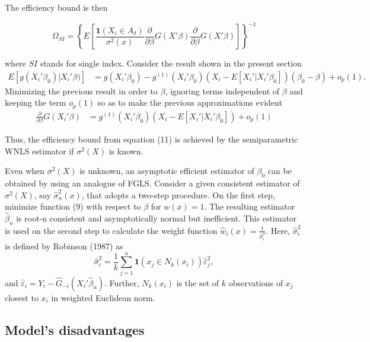\documentclass[a4paper]{article}
\begin{document}
The efficiency bound is then

\begin{equation}
\Omega_{SI} = \left\{ E\left[\frac{\mathbf{1}{(X_i \in A_\delta)}}{\sigma^2(x)}\frac{\partial}{\partial \beta}
 G(X'\beta)\frac{\partial}{\partial \beta} G(X'\beta) \right] \right\}^{-1}
\end{equation}

where $SI$ stands for single index. Consider the result shown in the present section
\begin{align*}
E[g(X_i'\beta_0)|X_i'\beta)] & = g(X_i'\beta_0) - g^{(1)}(X_i'\beta_0)( X_i - E[X_i'|X_i'\beta_0])(\beta_0 - \beta) + o_p(1)	.										   
\end{align*}
Minimizing the previous result in order to $\beta$, ignoring terms independent of $\beta$ and keeping the term $o_p(1)$ so as to make the previous approximations evident
\begin{align*}
 \frac{\partial}{\partial \beta} G(X_i'\beta) & = g^{(1)}(X_i'\beta_0)( X_i - E[X_i'|X_i'\beta_0]) + o_p(1)
\end{align*}

Thus, the efficiency bound from equation (11) is achieved by the semiparametric WNLS estimator if $\sigma^2(X)$ is known.

Even when $\sigma^2(X)$ is unknown, an asymptotic efficient estimator of $\beta_0$ can be obtained by using an analogue of FGLS.  Consider a given consistent estimator of $\sigma^2(X)$, say $\hat{\sigma}_{n}^{2}(x)$, that adopts a two-step procedure. On the first step, minimize function (9) with respect to $\beta$ for $w(x) = 1$. The resulting estimator $\hat{\beta}_n$ is root-n consistent and asymptotically normal but inefficient. This estimator is used on the second step to calculate the weight function $\hat{w}_i(x) = \frac{1}{\hat{\sigma}_{i}^{2}}$. Here, $\hat{\sigma}_{i}^{2}$ is defined by Robinson (1987) \cite{[20]} as 
\[\hat{\sigma}_{i}^{2} = \frac{1}{k}\sum_{j=1}^{n} \mathbf{1}{(x_j \in N_k(x_i))}\hat{\varepsilon}_{j}^{2} ,\]
and $\hat{\varepsilon}_i = Y_i - \hat{G}_{-i}(X_i'\hat{\beta}_n)$. Further, $N_k(x_i)$ is the set of $k$ observations of $x_j$ closest to $x_i$ in weighted Euclidean norm.




\subsection{Model's disadvantages} %
\label{sub:Model's disadvantages}
\end{document}
